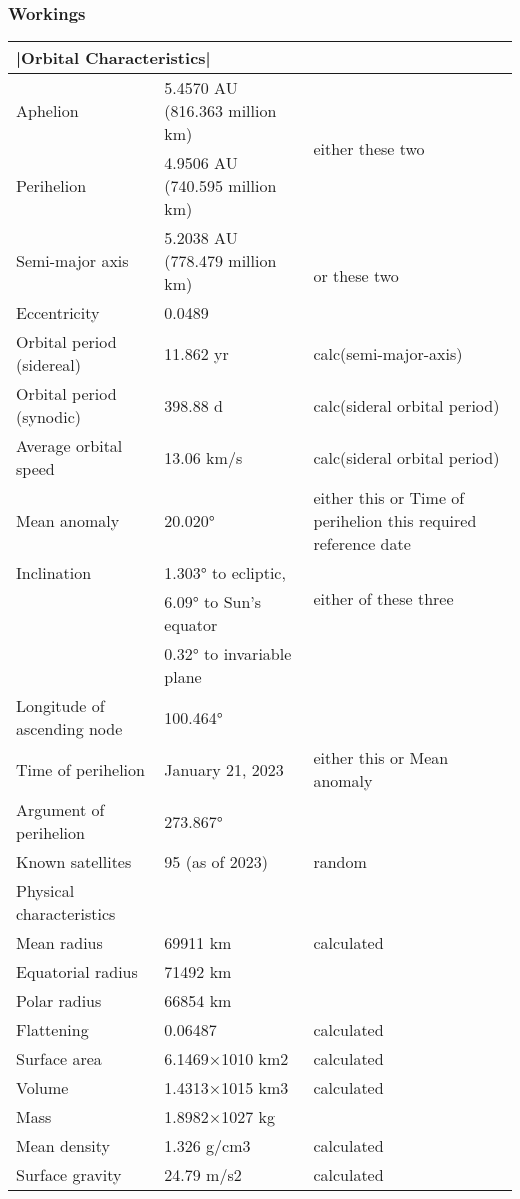 \subsubsection{Workings}
\begin{tabular}{ | l | l | p{3cm}|}
\hline
\multicolumn{3}{l}{|Orbital Characteristics|}  \\
\hline
Aphelion&5.4570 AU (816.363 million km)       & \multirow{2}{2cm}{either these two}\\
Perihelion&4.9506 AU (740.595 million km)  &    \\
\hline
Semi-major axis&5.2038 AU (778.479 million km) & \multirow{2}{2cm}{or these two} \\
Eccentricity&0.0489  & \\
\hline
Orbital period (sidereal) & 11.862 yr  & calc(semi-major-axis)\\
Orbital period (synodic)&398.88 d      & calc(sideral orbital period)\\
\hline
Average orbital speed&13.06 km/s       & calc(sideral orbital period) \\
\hline
Mean anomaly&20.020° & either this or Time of perihelion
this required reference date \\
\hline
Inclination&
1.303° to ecliptic,& \multirow{2}{2cm}{either of these three}\\
&6.09° to Sun's equator &, \\
&0.32° to invariable plane  & \\
\hline
Longitude of ascending node&100.464° & \\
\hline
Time of perihelion&January 21, 2023 & either this or Mean anomaly \\
\hline
Argument of perihelion&273.867° & \\
\hline
Known satellites&95 (as of 2023) & random\\
\hline
Physical characteristics & \\
\hline
Mean radius&69911 km & calculated\\
Equatorial radius&71492 km & \\
Polar radius&66854 km & \\
Flattening&0.06487 & calculated\\
Surface area&6.1469×1010 km2 & calculated\\
Volume&1.4313×1015 km3 & calculated\\
Mass&1.8982×1027 kg & \\
Mean density&1.326 g/cm3 & calculated\\
Surface gravity&24.79 m/s2 & calculated\\

\end{tabular}
